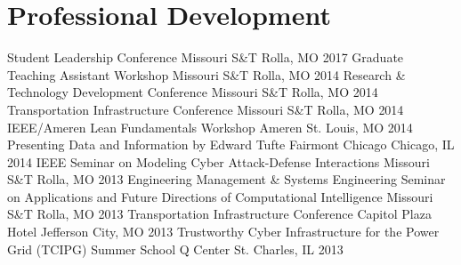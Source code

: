 \section{Professional Development}
\begin{cvhonors}
  \cvhonor
    {Student Leadership Conference}
    {Missouri S\&T}
    {Rolla, MO}
    {2017}
  \cvhonor
    {Graduate Teaching Assistant Workshop}
    {Missouri S\&T}
    {Rolla, MO}
    {2014}
  \cvhonor
    {Research \& Technology Development Conference}
    {Missouri S\&T}
    {Rolla, MO}
    {2014}
  \cvhonor
    {Transportation Infrastructure Conference}
    {Missouri S\&T}
    {Rolla, MO}
    {2014}
  \cvhonor
    {IEEE/Ameren Lean Fundamentals Workshop}
    {Ameren}
    {St. Louis, MO}
    {2014}
  \cvhonor
    {Presenting Data and Information by Edward Tufte}
    {Fairmont Chicago}
    {Chicago, IL}
    {2014}
  \cvhonor
    {IEEE Seminar on Modeling Cyber Attack-Defense Interactions}
    {Missouri S\&T}
    {Rolla, MO}
    {2013}
  \cvhonor
    {Engineering Management \& Systems Engineering Seminar on Applications and Future Directions of Computational Intelligence}
    {Missouri S\&T}
    {Rolla, MO}
    {2013}
  \cvhonor
    {Transportation Infrastructure Conference}
    {Capitol Plaza Hotel}
    {Jefferson City, MO}
    {2013}
  \cvhonor
    {Trustworthy Cyber Infrastructure for the Power Grid (TCIPG) Summer School}
    {Q Center}
    {St. Charles, IL}
    {2013}
\end{cvhonors} 